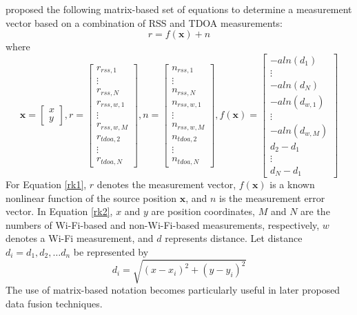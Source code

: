 \documentclass[12pt]{uthesis-v12}  %
\begin{document}
\cite{kumarasiri1} proposed the following matrix-based set of equations to determine a measurement vector based on a combination of RSS and TDOA measurements:
\begin{equation}
r = f(\textbf{x}) + n
\label{rk1}
\end{equation}
where
\begin{equation}
\textbf{x}=\begin{bmatrix*}
x \\ y \end{bmatrix*},  r =
\begin{bmatrix*}
r_{rss,1} \\ \vdots \\ r_{rss,N} \\ r_{rss,w,1} \\ \vdots \\ r_{rss,w,M} \\ r_{tdoa,2} \\ \vdots \\ r_{tdoa,N}
\end{bmatrix*}, n = 
\begin{bmatrix*}
n_{rss,1} \\ \vdots \\n_{rss,N} \\ n_{rss,w,1} \\ \vdots \\ n_{rss,w,M} \\ n_{tdoa,2} \\ \vdots \\ n_{tdoa,N}
\end{bmatrix*}, f(\textbf{x}) = 
\begin{bmatrix*}
-a ln(d_1) \\ \vdots \\ -a ln(d_N) \\ -a ln(d_{w,1}) \\ \vdots \\ -a ln(d_{w,M}) \\ d_2 - d_1 \\ \vdots \\ d_N - d_1
\end{bmatrix*}
\label{rk2}
\end{equation}
For Equation \ref{rk1}, $r$ denotes the measurement vector, $f(\textbf{x})$ is a known nonlinear function of the source position $\textbf{x}$, and $n$ is the measurement error vector. In Equation \ref{rk2}, $x$ and $y$ are position coordinates, $M$ and $N$ are the numbers of Wi-Fi-based and non-Wi-Fi-based measurements, respectively, $w$ denotes a Wi-Fi measurement, and $d$ represents distance. Let distance $d_i = d_1,d_2,\dots d_n$ be represented by
\begin{equation}
d_i = \sqrt{(x-x_i)^2+(y-y_i)^2}
\label{dist}
\end{equation}
The use of matrix-based notation becomes particularly useful in later proposed data fusion techniques.
\end{document}
